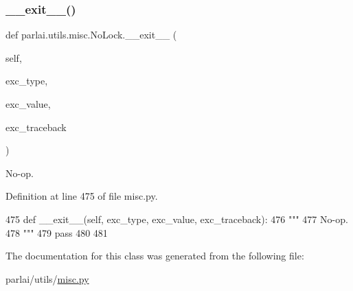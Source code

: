 \subsubsection{\texorpdfstring{\+\_\+\+\_\+exit\+\_\+\+\_\+()}{\_\_exit\_\_()}}
{\footnotesize\ttfamily def parlai.\+utils.\+misc.\+No\+Lock.\+\_\+\+\_\+exit\+\_\+\+\_\+ (\begin{DoxyParamCaption}\item[{}]{self,  }\item[{}]{exc\+\_\+type,  }\item[{}]{exc\+\_\+value,  }\item[{}]{exc\+\_\+traceback }\end{DoxyParamCaption})}

\begin{DoxyVerb}No-op.
\end{DoxyVerb}
 

Definition at line 475 of file misc.\+py.


\begin{DoxyCode}
475     \textcolor{keyword}{def }\_\_exit\_\_(self, exc\_type, exc\_value, exc\_traceback):
476         \textcolor{stringliteral}{"""}
477 \textcolor{stringliteral}{        No-op.}
478 \textcolor{stringliteral}{        """}
479         \textcolor{keywordflow}{pass}
480 
481 
\end{DoxyCode}


The documentation for this class was generated from the following file\+:\begin{DoxyCompactItemize}
\item 
parlai/utils/\hyperlink{misc_8py}{misc.\+py}\end{DoxyCompactItemize}
